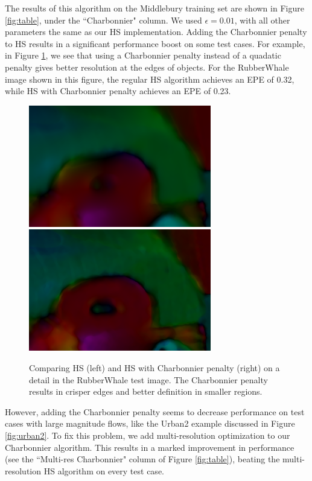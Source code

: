 \documentclass[10pt,twocolumn,letterpaper]{article}
\begin{document}
The results of this algorithm on the Middlebury training set are shown in Figure \ref{fig:table}, under the ``Charbonnier" column.  We used $\epsilon=0.01$, with all other parameters the same as our HS implementation.  Adding the Charbonnier penalty to HS results in a significant performance boost on some test cases.  For example, in Figure \ref{fig:charbonnier}, we see that using a Charbonnier penalty instead of a quadatic penalty gives better resolution at the edges of objects.  For the RubberWhale image shown in this figure, the regular HS algorithm achieves an EPE of 0.32, while HS with Charbonnier penalty achieves an EPE of 0.23.

\begin{figure}
\includegraphics[width=0.48 \columnwidth] {10iter_crop.png} 
\includegraphics[width=0.48 \columnwidth] {charbonnier_crop.png}

\caption{Comparing HS (left) and HS with Charbonnier penalty (right) on a detail in the RubberWhale test image.  The Charbonnier penalty results in crisper edges and better definition in smaller regions.}
\label{fig:charbonnier}
\end{figure}

However, adding the Charbonnier penalty seems to decrease performance on test cases with large magnitude flows, like the Urban2 example discussed in Figure \ref{fig:urban2}.  To fix this problem, we add multi-resolution optimization to our Charbonnier algorithm.  This results in a marked improvement in performance (see the ``Multi-res Charbonnier" column of Figure \ref{fig:table}), beating the multi-resolution HS algorithm on every test case.
\end{document}

